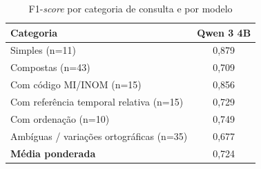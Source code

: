 \begin{table}[htbp!]
\centering
\caption{F1-\textit{score} por categoria de consulta e por modelo}
\label{tab:resultados_por_categoria_estacao}
\small
\begin{tabular}{|l|c|}
\hline
\textbf{Categoria} & \textbf{Qwen 3 4B} \\
\hline
Simples (n=11) & 0,879 \\
Compostas (n=43) & 0,709 \\
Com código MI/INOM (n=15) & 0,856 \\
Com referência temporal relativa (n=15) & 0,729 \\
Com ordenação (n=10) & 0,749 \\
Ambíguas / variações ortográficas (n=35) & 0,677 \\
\hline
\textbf{Média ponderada} & 0,724 \\
\hline
\end{tabular}
\end{table}
